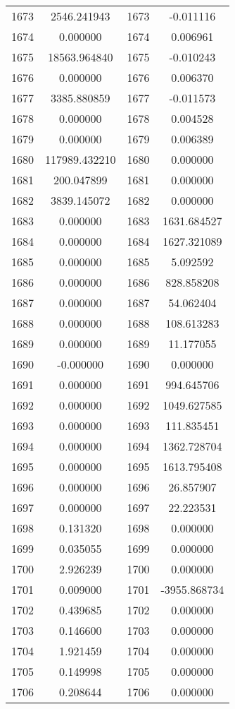 \documentclass[12pt]{article}
\begin{document}
\begin{longtable}{@{}cccc@{}}
1673 & 2546.241943 & 1673 & -0.011116 \\
1674 & 0.000000 & 1674 & 0.006961 \\
1675 & 18563.964840 & 1675 & -0.010243 \\
1676 & 0.000000 & 1676 & 0.006370 \\
1677 & 3385.880859 & 1677 & -0.011573 \\
1678 & 0.000000 & 1678 & 0.004528 \\
1679 & 0.000000 & 1679 & 0.006389 \\
1680 & 117989.432210 & 1680 & 0.000000 \\
1681 & 200.047899 & 1681 & 0.000000 \\
1682 & 3839.145072 & 1682 & 0.000000 \\
1683 & 0.000000 & 1683 & 1631.684527 \\
1684 & 0.000000 & 1684 & 1627.321089 \\
1685 & 0.000000 & 1685 & 5.092592 \\
1686 & 0.000000 & 1686 & 828.858208 \\
1687 & 0.000000 & 1687 & 54.062404 \\
1688 & 0.000000 & 1688 & 108.613283 \\
1689 & 0.000000 & 1689 & 11.177055 \\
1690 & -0.000000 & 1690 & 0.000000 \\
1691 & 0.000000 & 1691 & 994.645706 \\
1692 & 0.000000 & 1692 & 1049.627585 \\
1693 & 0.000000 & 1693 & 111.835451 \\
1694 & 0.000000 & 1694 & 1362.728704 \\
1695 & 0.000000 & 1695 & 1613.795408 \\
1696 & 0.000000 & 1696 & 26.857907 \\
1697 & 0.000000 & 1697 & 22.223531 \\
1698 & 0.131320 & 1698 & 0.000000 \\
1699 & 0.035055 & 1699 & 0.000000 \\
1700 & 2.926239 & 1700 & 0.000000 \\
1701 & 0.009000 & 1701 & -3955.868734 \\
1702 & 0.439685 & 1702 & 0.000000 \\
1703 & 0.146600 & 1703 & 0.000000 \\
1704 & 1.921459 & 1704 & 0.000000 \\
1705 & 0.149998 & 1705 & 0.000000 \\
1706 & 0.208644 & 1706 & 0.000000 \\

\end{longtable}
\end{document}
